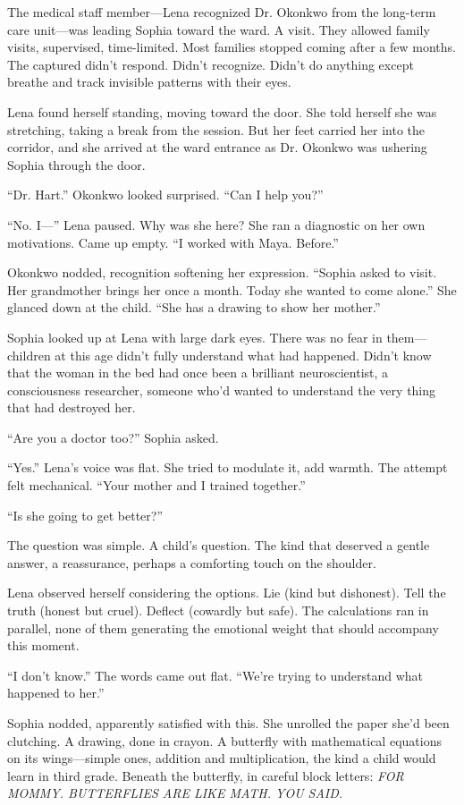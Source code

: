 The medical staff member—Lena recognized Dr. Okonkwo from the long-term care unit—was leading Sophia toward the ward. A visit. They allowed family visits, supervised, time-limited. Most families stopped coming after a few months. The captured didn't respond. Didn't recognize. Didn't do anything except breathe and track invisible patterns with their eyes.

Lena found herself standing, moving toward the door. She told herself she was stretching, taking a break from the session. But her feet carried her into the corridor, and she arrived at the ward entrance as Dr. Okonkwo was ushering Sophia through the door.

``Dr. Hart.'' Okonkwo looked surprised. ``Can I help you?''

``No. I—'' Lena paused. Why was she here? She ran a diagnostic on her own motivations. Came up empty. ``I worked with Maya. Before.''

Okonkwo nodded, recognition softening her expression. ``Sophia asked to visit. Her grandmother brings her once a month. Today she wanted to come alone.'' She glanced down at the child. ``She has a drawing to show her mother.''

Sophia looked up at Lena with large dark eyes. There was no fear in them—children at this age didn't fully understand what had happened. Didn't know that the woman in the bed had once been a brilliant neuroscientist, a consciousness researcher, someone who'd wanted to understand the very thing that had destroyed her.

``Are you a doctor too?'' Sophia asked.

``Yes.'' Lena's voice was flat. She tried to modulate it, add warmth. The attempt felt mechanical. ``Your mother and I trained together.''

``Is she going to get better?''

The question was simple. A child's question. The kind that deserved a gentle answer, a reassurance, perhaps a comforting touch on the shoulder.

Lena observed herself considering the options. Lie (kind but dishonest). Tell the truth (honest but cruel). Deflect (cowardly but safe). The calculations ran in parallel, none of them generating the emotional weight that should accompany this moment.

``I don't know.'' The words came out flat. ``We're trying to understand what happened to her.''

Sophia nodded, apparently satisfied with this. She unrolled the paper she'd been clutching. A drawing, done in crayon. A butterfly with mathematical equations on its wings—simple ones, addition and multiplication, the kind a child would learn in third grade. Beneath the butterfly, in careful block letters: \textit{FOR MOMMY. BUTTERFLIES ARE LIKE MATH. YOU SAID.}

